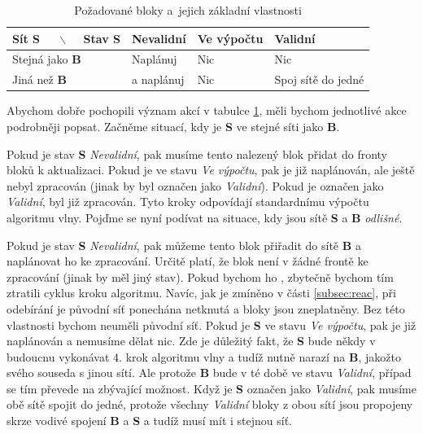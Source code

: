 \begin{table}[h]
\centering
\begin{tabular}{| l | l | l | l |}
	\hline
	Sít  \textbf{S}~~~$\backslash$~~ Stav \textbf{S}	& Nevalidní			& Ve výpočtu	& Validní 			\\ \hline
	Stejná jako \textbf{B}					& Naplánuj 	 		& Nic 			& Nic 	     			\\ \hline
	Jiná než \textbf{B} 						& \uv{Ukradni} a naplánuj & Nic 			& Spoj sítě do jedné   	\\ \hline
\end{tabular}
\caption{Požadované bloky a~jejich základní vlastnosti}
\label{table:networkAlg}
\end{table}

\FloatBarrier

Abychom dobře pochopili význam akcí v tabulce \ref{table:networkAlg}, měli bychom jednotlivé akce podrobněji popsat. Začněme situací, kdy je \textbf{S} ve stejné síti jako \textbf{B}.

Pokud je stav \textbf{S} \textit{Nevalidní}, pak musíme tento nalezený blok přidat do fronty bloků k aktualizaci. Pokud je ve stavu \textit{Ve výpočtu}, pak je již naplánován, ale ještě nebyl zpracován (jinak by byl označen jako \textit{Validní}). Pokud je označen jako \textit{Validní}, byl již zpracován. Tyto kroky odpovídají standardnímu výpočtu algoritmu vlny. Pojďme se nyní podívat na situace, kdy jsou sítě \textbf{S} a \textbf{B} \textit{odlišné}.

Pokud je stav \textbf{S} \textit{Nevalidní}, pak můžeme tento blok přiřadit do sítě \textbf{B} a naplánovat ho ke zpracování. Určitě platí, že blok není v žádné frontě ke zpracování (jinak by měl jiný stav). Pokud bychom ho , zbytečně bychom tím ztratili cyklus kroku algoritmu. Navíc, jak je zmíněno v části \ref{subsec:reac}, při odebírání je původní síť ponechána netknutá a bloky jsou zneplatněny. Bez této vlastnosti bychom neuměli  původní síť. Pokud je \textbf{S} ve stavu \textit{Ve výpočtu}, pak je již naplánován a nemusíme dělat nic. Zde je důležitý fakt, že \textbf{S} bude někdy v budoucnu vykonávat 4. krok algoritmu vlny a tudíž nutně narazí na \textbf{B}, jakožto svého souseda s jinou sítí. Ale protože \textbf{B} bude v té době ve stavu \textit{Validní}, případ se tím převede na zbývající možnost. Když je \textbf{S} označen jako \textit{Validní}, pak musíme obě sítě spojit do jedné, protože všechny \textit{Validní} bloky z obou sítí jsou propojeny skrze vodivé spojení \textbf{B} a \textbf{S} a tudíž musí mít i stejnou síť.



